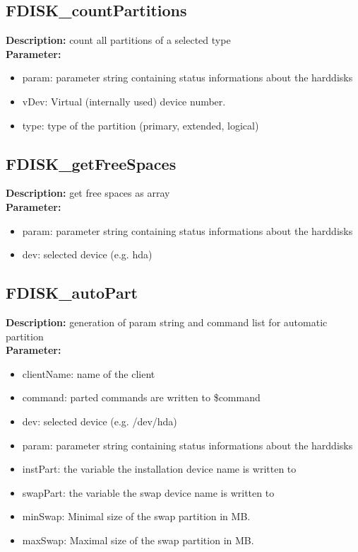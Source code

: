 \subsection{FDISK\_countPartitions}
\textbf{Description:} count all partitions of a selected type\\
\textbf{Parameter:}
\begin{itemize}
\item param: parameter string containing status informations about the harddisks
\item vDev: Virtual (internally used) device number.
\item type: type of the partition (primary, extended, logical)
\end{itemize}

\subsection{FDISK\_getFreeSpaces}
\textbf{Description:} get free spaces as array\\
\textbf{Parameter:}
\begin{itemize}
\item param: parameter string containing status informations about the harddisks
\item dev: selected device (e.g. hda)
\end{itemize}

\subsection{FDISK\_autoPart}
\textbf{Description:} generation of param string and command list for automatic partition\\
\textbf{Parameter:}
\begin{itemize}
\item clientName: name of the client
\item command: parted commands are written to \$command
\item dev: selected device (e.g. /dev/hda)
\item param: parameter string containing status informations about the harddisks
\item instPart: the variable the installation device name is written to
\item swapPart: the variable the swap device name is written to
\item minSwap: Minimal size of the swap partition in MB.
\item maxSwap: Maximal size of the swap partition in MB.
\end{itemize}


